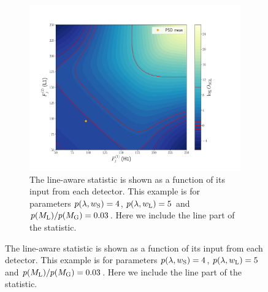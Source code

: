 \begin{figure}
\begin{subfigure}[h]{\linewidth}
\begin{minipage}{0.65\linewidth}
\includegraphics[width=0.9\columnwidth]{C3_soap/lookup_linesmall.pdf}
\end{minipage}\hfill
\begin{minipage}{0.35\linewidth}
\caption{The line-aware statistic is shown as a function of its input from each detector. This example is for parameters $p(\lambda,w_{\rm{S}}) = 4$, $p(\lambda,w_{\rm{L}}) = 5$ and $p(M_{\rm{L}})/p(M_{\rm{G}}) = 0.03$. Here we include the line part of the statistic.}
\label{soap:las:detp:linesmall}
\end{minipage}
\end{subfigure}


\end{figure}
